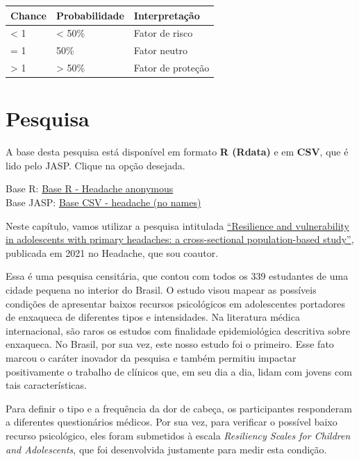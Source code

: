 \documentclass[
]{book}
\newenvironment{base}{
  \definecolor{shadecolor}{rgb}{0, 0, 0}  %
  \color{white}
  \begin{shaded}}
 {\end{shaded}}
\begin{document}
\begin{longtable}[]{@{}lll@{}}
\toprule
Chance & Probabilidade & Interpretação\tabularnewline
\midrule
\endhead
\textless{} 1 & \textless{} 50\% & Fator de risco\tabularnewline
= 1 & 50\% & Fator neutro\tabularnewline
\textgreater{} 1 & \textgreater{} 50\% & Fator de proteção\tabularnewline
\bottomrule
\end{longtable}

\hypertarget{pesquisa-6}{%
\section{Pesquisa}\label{pesquisa-6}}

\begin{base}

A base desta pesquisa está disponível em formato \textbf{R (Rdata)} e em \textbf{CSV}, que é lido pelo JASP. Clique na opção desejada.

Base R: \href{https://github.com/anovabr/mqt/raw/master/bases/Base\%20R\%20-\%20Headache\%20anonymous.RData}{Base R - Headache anonymous}\\
Base JASP: \href{https://github.com/anovabr/mqt/raw/master/bases/bases_csv_jasp.zip}{Base CSV - headache (no names)}

\end{base}

Neste capítulo, vamos utilizar a pesquisa intitulada \href{www.google.com}{``Resilience and vulnerability in adolescents with primary headaches: a cross-sectional population-based study''}, publicada em 2021 no Headache, que sou coautor.

Essa é uma pesquisa censitária, que contou com todos os 339 estudantes de uma cidade pequena no interior do Brasil. O estudo visou mapear as possíveis condições de apresentar baixos recursos psicológicos em adolescentes portadores de enxaqueca de diferentes tipos e intensidades. Na literatura médica internacional, são raros os estudos com finalidade epidemiológica descritiva sobre enxaqueca. No Brasil, por sua vez, este nosso estudo foi o primeiro. Esse fato marcou o caráter inovador da pesquisa e também permitiu impactar positivamente o trabalho de clínicos que, em seu dia a dia, lidam com jovens com tais características.

Para definir o tipo e a frequência da dor de cabeça, os participantes responderam a diferentes questionários médicos. Por sua vez, para verificar o possível baixo recurso psicológico, eles foram submetidos à escala \emph{Resiliency Scales for Children and Adolescents}, que foi desenvolvida justamente para medir esta condição.
\end{document}
